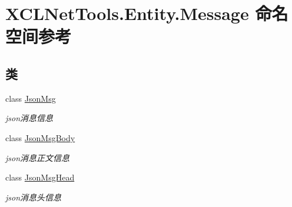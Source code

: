 \hypertarget{namespace_x_c_l_net_tools_1_1_entity_1_1_message}{}\section{X\+C\+L\+Net\+Tools.\+Entity.\+Message 命名空间参考}
\label{namespace_x_c_l_net_tools_1_1_entity_1_1_message}
\subsection*{类}
\begin{DoxyCompactItemize}
\item 
class \hyperlink{class_x_c_l_net_tools_1_1_entity_1_1_message_1_1_json_msg}{Json\+Msg}
\begin{DoxyCompactList}\small\item\em json消息信息 \end{DoxyCompactList}\item 
class \hyperlink{class_x_c_l_net_tools_1_1_entity_1_1_message_1_1_json_msg_body}{Json\+Msg\+Body}
\begin{DoxyCompactList}\small\item\em json消息正文信息 \end{DoxyCompactList}\item 
class \hyperlink{class_x_c_l_net_tools_1_1_entity_1_1_message_1_1_json_msg_head}{Json\+Msg\+Head}
\begin{DoxyCompactList}\small\item\em json消息头信息 \end{DoxyCompactList}\end{DoxyCompactItemize}
